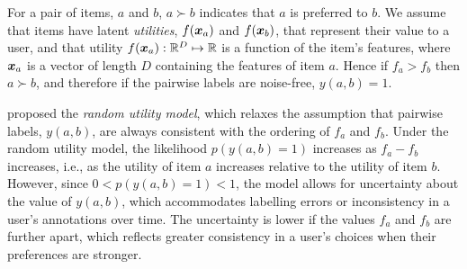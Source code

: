 



For a pair of items, $a$ and $b$, 
$a \succ b$ indicates that $a$ is preferred to $b$.  
We assume that items have latent \emph{utilities},
$f(\boldsymbol x_a)$ and $f(\boldsymbol x_b)$, that represent their value to a user,
and that
utility $f(\boldsymbol x_a) : \mathbb{R}^D \mapsto \mathbb{R}$ 
is a function of the item's features, where $\boldsymbol x_a$ is a vector of length $D$
containing the features of item $a$.
Hence if $f_a > f_b$ then $a \succ b$,
and therefore if the pairwise labels are noise-free, $y(a, b) =1$.

\citet{thurstone1927law} proposed the \emph{random utility model},
which relaxes the assumption that pairwise labels, $y(a, b)$,
are always consistent with the ordering of $f_a$ and $f_b$.
Under the random utility model, the likelihood $p(y(a,b)=1)$ 
increases as $f_a - f_b$ increases, i.e.,
as the utility of item $a$ increases
relative to the utility of item $b$.
However, since $0 < p(y(a,b)=1) < 1$, the model 
allows for uncertainty about the value of $y(a,b)$,
which accommodates labelling errors or
inconsistency in a user's annotations over time.
The uncertainty is lower if the values $f_a$ and $f_b$ are further apart, 
which reflects greater consistency in a user's choices
when their preferences are stronger.
 

